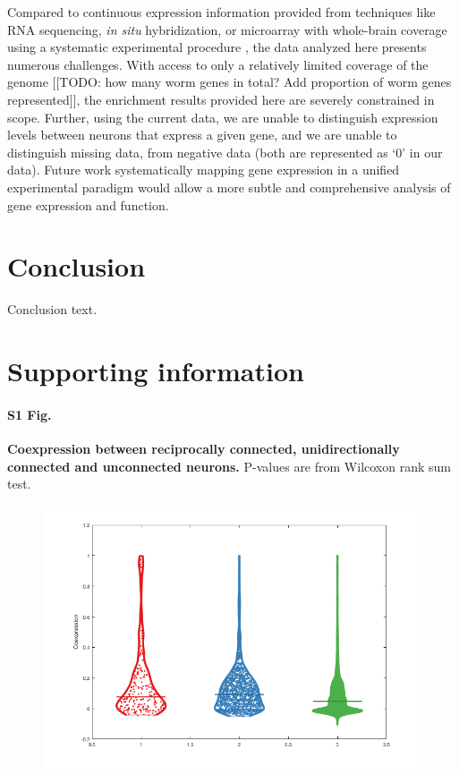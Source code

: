 \documentclass[10pt,letterpaper]{article}
\begin{document}
Compared to continuous expression information provided from techniques like RNA sequencing, \emph{in situ} hybridization, or microarray with whole-brain coverage using a systematic experimental procedure \cite{Lein:2007jn, Shen:2012ua, Tasic:2016jp}, the data analyzed here presents numerous challenges.
With access to only a relatively limited coverage of the genome [[TODO: how many worm genes in total? Add proportion of worm genes represented]], the enrichment results provided here are severely constrained in scope.
Further, using the current data, we are unable to distinguish expression levels between neurons that express a given gene, and we are unable to distinguish missing data, from negative data (both are represented as `0' in our data).
Future work systematically mapping gene expression in a unified experimental paradigm would allow a more subtle and comprehensive analysis of gene expression and function.

\section*{Conclusion}

Conclusion text.

\section*{Supporting information}


\paragraph*{S1 Fig.}
{\bf Coexpression between reciprocally connected, unidirectionally connected and unconnected neurons.} P-values are from Wilcoxon rank sum test.
\begin{figure}[!h]
\label{S1_Fig}
\centering
    \includegraphics[width=1\textwidth]{RecUnidirUncon}
\end{figure}
\end{document}
